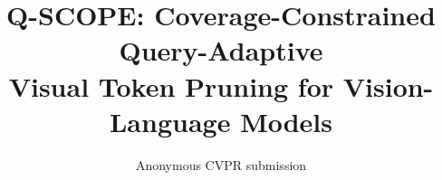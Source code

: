 \documentclass[10pt,twocolumn,letterpaper]{article}
\title{Q-SCOPE: Coverage-Constrained Query-Adaptive\\Visual Token Pruning for Vision-Language Models}
\author{Anonymous CVPR submission}
\begin{document}
\maketitle







{\small


}
\end{document}
